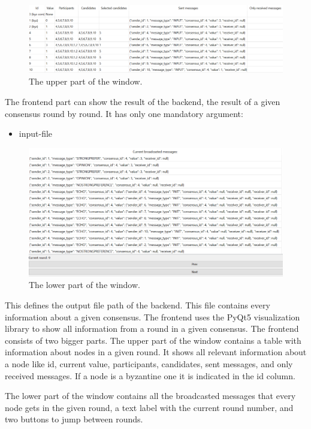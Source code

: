 \documentclass{article}
\begin{document}
\begin{figure}[hbt!]
    \centering
    \includegraphics[width=1\textwidth]{figures/upper_part_table.png}
    \caption{The upper part of the window.\label{upper_part_table_fig}}
\end{figure}

The frontend part can show the result of the backend, the result of a given consensus round by round. It has only one mandatory argument:
\begin{itemize}
  \item input-file
\end{itemize}
\begin{figure}[hbt!]
    \centering
    \includegraphics[width=1\textwidth]{figures/lower_part_table.png}
    \caption{The lower part of the window.\label{lower_part_table_fig}}
\end{figure}
This defines the output file path of the backend. This file contains every information about a given consensus. The frontend uses the PyQt5 visualization library to show all information from a round in a given consensus. The frontend consists of two bigger parts. The upper part of the window contains a table with information about nodes in a given round. It shows all relevant information about a node like id, current value, participants, candidates, sent messages, and only received messages. If a node is a byzantine one it is indicated in the id column. 

The lower part of the window contains all the broadcasted messages that every node gets in the given round, a text label with the current round number, and two buttons to jump between rounds.
\end{document}
